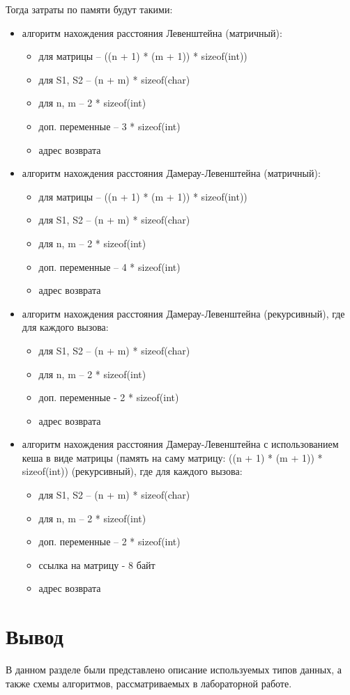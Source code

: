 Тогда затраты по памяти будут такими:
\begin{itemize}
    \item алгоритм нахождения расстояния Левенштейна (матричный):

    \begin{itemize}
        \item для матрицы -- ((n + 1) * (m + 1)) * sizeof(int))
        \item для S1, S2 -- (n + m) * sizeof(char)
        \item для n, m -- 2 * sizeof(int)
        \item доп. переменные -- 3 * sizeof(int)
        \item адрес возврата
    \end{itemize}

    \item алгоритм нахождения расстояния Дамерау-Левенштейна (матричный):

    \begin{itemize}
        \item для матрицы -- ((n + 1) * (m + 1)) * sizeof(int))
        \item для S1, S2 -- (n + m) * sizeof(char)
        \item для n, m -- 2 * sizeof(int)
        \item доп. переменные -- 4 * sizeof(int)
        \item адрес возврата
    \end{itemize}

    \item алгоритм нахождения расстояния Дамерау-Левенштейна (рекурсивный), где для каждого вызова:

    \begin{itemize}
        \item для S1, S2 -- (n + m) * sizeof(char)
        \item для n, m -- 2 * sizeof(int)
        \item доп. переменные - 2 * sizeof(int)
        \item адрес возврата
    \end{itemize}

    \item алгоритм нахождения расстояния Дамерау-Левенштейна с использованием кеша в виде матрицы (память на саму матрицу: ((n + 1) * (m + 1)) * sizeof(int)) (рекурсивный), где для каждого вызова:

    \begin{itemize}
        \item для S1, S2 -- (n + m) * sizeof(char)
        \item для n, m -- 2 * sizeof(int)
        \item доп. переменные -- 2 * sizeof(int)
        \item ссылка на матрицу - 8 байт
        \item адрес возврата
    \end{itemize}

\end{itemize}

\section{Вывод}
В данном разделе были представлено описание используемых типов данных, а также схемы алгоритмов, рассматриваемых в лабораторной работе.